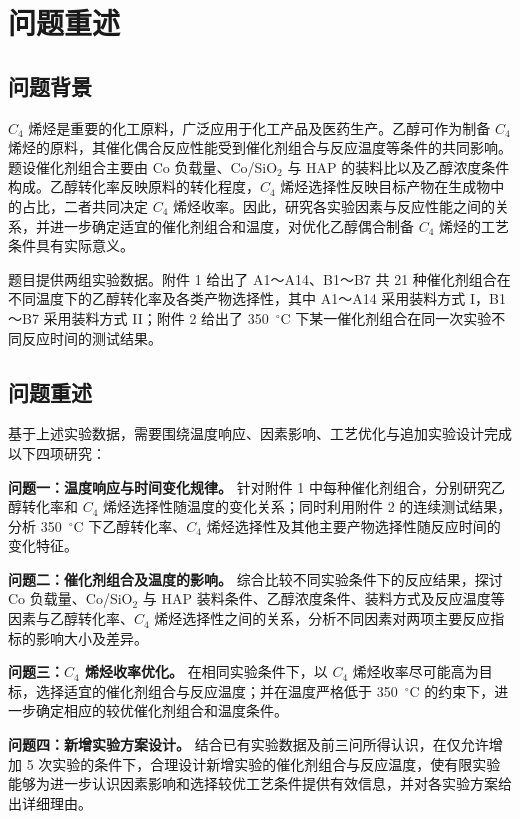 \section{问题重述}

\subsection{问题背景}

${C_4}$ 烯烃是重要的化工原料，广泛应用于化工产品及医药生产。乙醇可作为制备 ${C_4}$ 烯烃的原料，其催化偶合反应性能受到催化剂组合与反应温度等条件的共同影响。题设催化剂组合主要由 Co 负载量、Co/SiO$_2$ 与 HAP 的装料比以及乙醇浓度条件构成。乙醇转化率反映原料的转化程度，${C_4}$ 烯烃选择性反映目标产物在生成物中的占比，二者共同决定 ${C_4}$ 烯烃收率。因此，研究各实验因素与反应性能之间的关系，并进一步确定适宜的催化剂组合和温度，对优化乙醇偶合制备 ${C_4}$ 烯烃的工艺条件具有实际意义。

题目提供两组实验数据。附件 1 给出了 A1～A14、B1～B7 共 21 种催化剂组合在不同温度下的乙醇转化率及各类产物选择性，其中 A1～A14 采用装料方式 I，B1～B7 采用装料方式 II；附件 2 给出了 350~$^{\circ}$C 下某一催化剂组合在同一次实验不同反应时间的测试结果。

\subsection{问题重述}

基于上述实验数据，需要围绕温度响应、因素影响、工艺优化与追加实验设计完成以下四项研究：

\noindent\textbf{问题一：温度响应与时间变化规律。}
针对附件 1 中每种催化剂组合，分别研究乙醇转化率和 ${C_4}$ 烯烃选择性随温度的变化关系；同时利用附件 2 的连续测试结果，分析 350~$^{\circ}$C 下乙醇转化率、${C_4}$ 烯烃选择性及其他主要产物选择性随反应时间的变化特征。

\noindent\textbf{问题二：催化剂组合及温度的影响。}
综合比较不同实验条件下的反应结果，探讨 Co 负载量、Co/SiO$_2$ 与 HAP 装料条件、乙醇浓度条件、装料方式及反应温度等因素与乙醇转化率、${C_4}$ 烯烃选择性之间的关系，分析不同因素对两项主要反应指标的影响大小及差异。

\noindent\textbf{问题三：${C_4}$ 烯烃收率优化。}
在相同实验条件下，以 ${C_4}$ 烯烃收率尽可能高为目标，选择适宜的催化剂组合与反应温度；并在温度严格低于 350~$^{\circ}$C 的约束下，进一步确定相应的较优催化剂组合和温度条件。

\noindent\textbf{问题四：新增实验方案设计。}
结合已有实验数据及前三问所得认识，在仅允许增加 5 次实验的条件下，合理设计新增实验的催化剂组合与反应温度，使有限实验能够为进一步认识因素影响和选择较优工艺条件提供有效信息，并对各实验方案给出详细理由。
